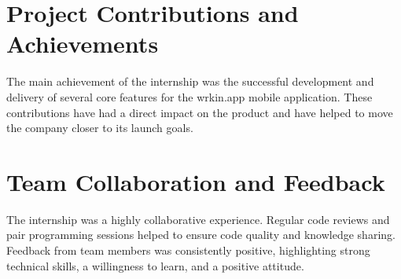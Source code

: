 \section{Project Contributions and Achievements}
The main achievement of the internship was the successful development and delivery of several core features for the wrkin.app mobile application. These contributions have had a direct impact on the product and have helped to move the company closer to its launch goals.

\section{Team Collaboration and Feedback}
The internship was a highly collaborative experience. Regular code reviews and pair programming sessions helped to ensure code quality and knowledge sharing. Feedback from team members was consistently positive, highlighting strong technical skills, a willingness to learn, and a positive attitude.